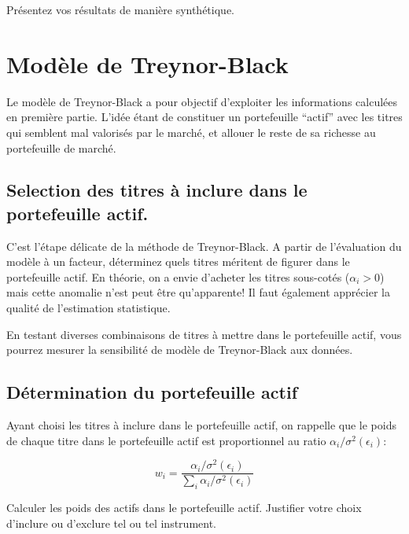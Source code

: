 \documentclass[
]{article}
\begin{document}
Présentez vos résultats de manière synthétique.

\hypertarget{moduxe8le-de-treynor-black}{%
\section{Modèle de Treynor-Black}\label{moduxe8le-de-treynor-black}}

Le modèle de Treynor-Black a pour objectif d'exploiter les informations
calculées en première partie. L'idée étant de constituer un portefeuille
``actif'' avec les titres qui semblent mal valorisés par le marché, et
allouer le reste de sa richesse au portefeuille de marché.

\hypertarget{selection-des-titres-uxe0-inclure-dans-le-portefeuille-actif.}{%
\subsection{Selection des titres à inclure dans le portefeuille
actif.}\label{selection-des-titres-uxe0-inclure-dans-le-portefeuille-actif.}}

C'est l'étape délicate de la méthode de Treynor-Black. A partir de
l'évaluation du modèle à un facteur, déterminez quels titres méritent de
figurer dans le portefeuille actif. En théorie, on a envie d'acheter les
titres sous-cotés (\(\alpha_i > 0\)) mais cette anomalie n'est peut être
qu'apparente! Il faut également apprécier la qualité de l'estimation
statistique.

En testant diverses combinaisons de titres à mettre dans le portefeuille
actif, vous pourrez mesurer la sensibilité de modèle de Treynor-Black
aux données.

\hypertarget{duxe9termination-du-portefeuille-actif}{%
\subsection{Détermination du portefeuille
actif}\label{duxe9termination-du-portefeuille-actif}}

Ayant choisi les titres à inclure dans le portefeuille actif, on
rappelle que le poids de chaque titre dans le portefeuille actif est
proportionnel au ratio \(\alpha_i/\sigma^2(\epsilon_i)\):

\[
w_i = \frac{\alpha_i/\sigma^2(\epsilon_i)}{\sum_i \alpha_i/\sigma^2(\epsilon_i)}
\]

Calculer les poids des actifs dans le portefeuille actif. Justifier
votre choix d'inclure ou d'exclure tel ou tel instrument.
\end{document}
